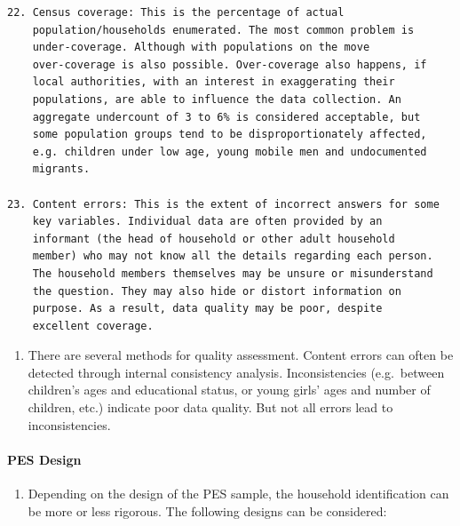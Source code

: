 \documentclass[
]{article}
\providecommand{\tightlist}{%
  \setlength{\itemsep}{0pt}\setlength{\parskip}{0pt}}
\begin{document}
\begin{verbatim}
22. Census coverage: This is the percentage of actual
    population/households enumerated. The most common problem is
    under-coverage. Although with populations on the move
    over-coverage is also possible. Over-coverage also happens, if
    local authorities, with an interest in exaggerating their
    populations, are able to influence the data collection. An
    aggregate undercount of 3 to 6% is considered acceptable, but
    some population groups tend to be disproportionately affected,
    e.g. children under low age, young mobile men and undocumented
    migrants.

23. Content errors: This is the extent of incorrect answers for some
    key variables. Individual data are often provided by an
    informant (the head of household or other adult household
    member) who may not know all the details regarding each person.
    The household members themselves may be unsure or misunderstand
    the question. They may also hide or distort information on
    purpose. As a result, data quality may be poor, despite
    excellent coverage.
\end{verbatim}

\begin{enumerate}
\def\labelenumi{\arabic{enumi}.}
\setcounter{enumi}{111}
\tightlist
\item
  There are several methods for quality assessment. Content errors
  can often be detected through internal consistency analysis.
  Inconsistencies (e.g.~between children's ages and educational
  status, or young girls' ages and number of children, etc.) indicate
  poor data quality. But not all errors lead to inconsistencies.
\end{enumerate}

\hypertarget{a.2.-pes-design}{%
\paragraph{PES Design}\label{a.2.-pes-design}}

\begin{enumerate}
\def\labelenumi{\arabic{enumi}.}
\setcounter{enumi}{112}
\tightlist
\item
  Depending on the design of the PES sample, the household
  identification can be more or less rigorous. The following designs
  can be considered:
\end{enumerate}
\end{document}
